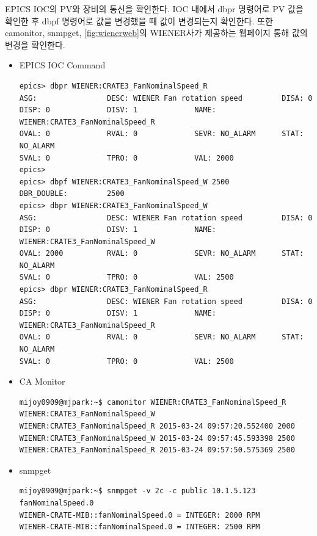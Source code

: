 \documentclass[11pt
  , a4paper
  , article
  , oneside
]{memoir}
\begin{document}
EPICS IOC의 PV와 장비의 통신을 확인한다. IOC 내에서 dbpr 명령어로 PV 값을 확인한 후 dbpf 명령어로 값을 변경했을 때 값이 변경되는지 확인한다. 또한 camonitor, snmpget, \ref{fig:wienerweb}의 WIENER사가 제공하는 웹페이지 통해 값의 변경을 확인한다.

\begin{itemize}
\item EPICS IOC Command\\
{\scriptsize
\begin{lstlisting}[style=termstyle]
epics> dbpr WIENER:CRATE3_FanNominalSpeed_R
ASG:                DESC: WIENER Fan rotation speed         DISA: 0             
DISP: 0             DISV: 1             NAME: WIENER:CRATE3_FanNominalSpeed_R   
OVAL: 0             RVAL: 0             SEVR: NO_ALARM      STAT: NO_ALARM      
SVAL: 0             TPRO: 0             VAL: 2000           
epics>
epics> dbpf WIENER:CRATE3_FanNominalSpeed_W 2500
DBR_DOUBLE:         2500      
epics> dbpr WIENER:CRATE3_FanNominalSpeed_W
ASG:                DESC: WIENER Fan rotation speed         DISA: 0             
DISP: 0             DISV: 1             NAME: WIENER:CRATE3_FanNominalSpeed_W   
OVAL: 2000          RVAL: 0             SEVR: NO_ALARM      STAT: NO_ALARM      
SVAL: 0             TPRO: 0             VAL: 2500      
epics> dbpr WIENER:CRATE3_FanNominalSpeed_R
ASG:                DESC: WIENER Fan rotation speed         DISA: 0             
DISP: 0             DISV: 1             NAME: WIENER:CRATE3_FanNominalSpeed_R   
OVAL: 0             RVAL: 0             SEVR: NO_ALARM      STAT: NO_ALARM      
SVAL: 0             TPRO: 0             VAL: 2500     
\end{lstlisting}
}
\item CA Monitor\\
{\scriptsize
\begin{lstlisting}[style=termstyle]
mijoy0909@mjpark:~$ camonitor WIENER:CRATE3_FanNominalSpeed_R WIENER:CRATE3_FanNominalSpeed_W
WIENER:CRATE3_FanNominalSpeed_R 2015-03-24 09:57:20.552400 2000  
WIENER:CRATE3_FanNominalSpeed_W 2015-03-24 09:57:45.593398 2500  
WIENER:CRATE3_FanNominalSpeed_R 2015-03-24 09:57:50.575369 2500  
\end{lstlisting}
}
\item snmpget\\
{\scriptsize
\begin{lstlisting}[style=termstyle]
mijoy0909@mjpark:~$ snmpget -v 2c -c public 10.1.5.123 fanNominalSpeed.0
WIENER-CRATE-MIB::fanNominalSpeed.0 = INTEGER: 2000 RPM
WIENER-CRATE-MIB::fanNominalSpeed.0 = INTEGER: 2500 RPM
\end{lstlisting}
}
\end{itemize}
\end{document}
